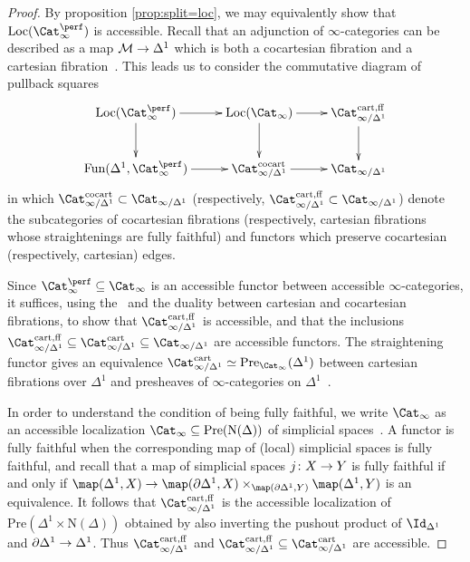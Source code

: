 \documentclass{amsart}
\renewcommand{\to}{\mathchoice{\longrightarrow}{\rightarrow}{\rightarrow}{\rightarrow}}
\let\catsymbfont\mathcal
\newcommand{\aM}{{\catsymbfont{M}}}
\newcommand{\Pre}{\mathrm{Pre}}
\newcommand{\idemstabcat}{\Cat_\i^{\perf}}
\newcommand{\Fun}{\mathrm{Fun}} %
\renewcommand{\i}{\infty}
\numberwithin{equation}{section}
\theoremstyle{definition}
\begin{document}
\begin{proof}
By proposition \ref{prop:split=loc}, we may equivalently show that
$\mathrm{Loc}(\idemstabcat)$ is accessible.  Recall that an adjunction
of $\i$-categories can be described as a map $\aM \to \Delta^1$ which
is both a cocartesian fibration and a cartesian
fibration~\cite[5.2.2.1]{HTT}.  This leads us to consider the
commutative diagram of pullback squares
\[
\xymatrix{
\mathrm{Loc}(\idemstabcat)\ar[r]\ar[d] & \mathrm{Loc}(\Cat_\i)\ar[r]\ar[d] & \Cat_{\i/\Delta^1}^\mathrm{cart,ff}\ar[d]\\
\Fun(\Delta^1,\idemstabcat)\ar[r] & \Cat_{\i/\Delta^1}^\mathrm{cocart}\ar[r] & \Cat_{\i/\Delta^1}}
\]
in which $\Cat_{\i/\Delta^1}^\mathrm{cocart}\subset\Cat_{\i/\Delta^1}$
(respectively,
$\Cat_{\i/\Delta^1}^\mathrm{cart,ff}\subset\Cat_{\i/\Delta^1}$) denote
the subcategories of cocartesian fibrations (respectively, cartesian
fibrations whose straightenings are fully faithful) and functors which
preserve cocartesian (respectively, cartesian) edges.

Since $\idemstabcat\subseteq\Cat_\i$ is an accessible functor between
accessible $\i$-categories, it suffices, using the~\cite[5.4.4.3,
5.4.5.16, 5.4.6.6]{HTT} and the duality between cartesian and
cocartesian fibrations, to show that
$\Cat_{\i/\Delta^1}^\mathrm{cart,ff}$ is accessible, and that the
inclusions 
$\Cat_{\i/\Delta^1}^\mathrm{cart,ff}\subseteq\Cat_{\i/\Delta^1}^\mathrm{cart}\subseteq\Cat_{\i/\Delta^1}$
are accessible functors. 
The straightening functor gives an equivalence
$\Cat_{\i/\Delta^1}^\mathrm{cart}\simeq\Pre_{\Cat_\i}(\Delta^1)$
between cartesian fibrations over $\Delta^1$ and presheaves of
$\i$-categories on $\Delta^1$~\cite[3.2.0.1]{HTT}.

In order to understand the condition of being fully faithful, we write
$\Cat_\i$ as an accessible localization
$\Cat_\i\subseteq\Pre(\mathrm{N}(\Delta))$ of simplicial
spaces~\cite{JT}.  A functor is fully faithful when the corresponding
map of (local) simplicial spaces is fully faithful, and recall that a
map of simplicial spaces $j\colon X\to Y$ is fully faithful if
and only if $\map(\Delta^1,X) \to \map(\partial\Delta^1,
X)\times_{\map(\partial\Delta^1,Y)} \map(\Delta^1, Y)$ is an 
equivalence.  It follows that $\Cat_{\i/\Delta^1}^\mathrm{cart,ff}$ is
the accessible localization of
$\Pre(\Delta^1\times\mathrm{N}(\Delta))$ obtained by also inverting
the pushout product of $\Id_{\Delta^1}$ and
$\partial\Delta^1\to\Delta^1$.  Thus
$\Cat_{\i/\Delta^1}^\mathrm{cart,ff}$ and
$\Cat_{\i/\Delta^1}^\mathrm{cart,ff}\subseteq\Cat_{\i/\Delta^1}^\mathrm{cart}$
are accessible.


\end{proof}
\end{document}
